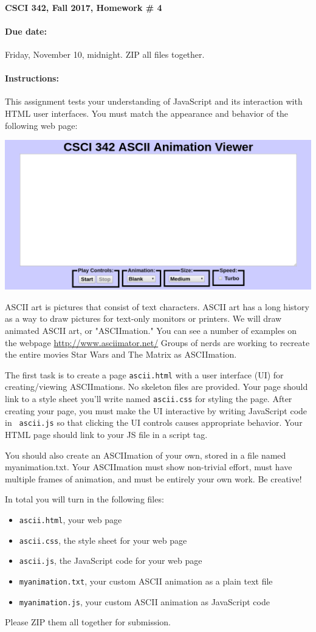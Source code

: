 \documentclass{article}
\newcommand{\myitem}{\paragraph}
\begin{document}
\myitem{CSCI 342, Fall 2017, Homework \# 4}

\myitem{Due date:}  Friday, November 10, midnight.  ZIP all files
together.

\myitem{Instructions:}


This assignment tests your understanding of JavaScript and its
interaction with HTML user interfaces.  You must match the appearance
and behavior of the following web page:

\centerline{\includegraphics[scale=0.5]{images/screenshot.png}}

ASCII art is pictures that consist of text characters.  ASCII art has
a long history as a way to draw pictures for text-only monitors or
printers.  We will draw animated ASCII art, or "ASCIImation." You can
see a number of examples on the webpage
\url{http://www.asciimator.net/} Groups of nerds are working to
recreate the entire movies Star Wars and The Matrix as ASCIImation.

The first task is to create a page {\tt ascii.html} with a user
interface (UI) for creating/viewing ASCIImations.  No skeleton files
are provided.  Your page should link to a style sheet you'll write
named {\tt ascii.css} for styling the page.  After creating your page,
you must make the UI interactive by writing JavaScript code in {\tt
  ascii.js} so that clicking the UI controls causes appropriate
behavior.  Your HTML page should link to your JS file in a script tag.

You should also create an ASCIImation of your own, stored in a file
named myanimation.txt.  Your ASCIImation must show non-trivial effort,
must have multiple frames of animation, and must be entirely your own
work.  Be creative!

In total you will turn in the following
files:
\begin{itemize}
\item {\tt ascii.html}, your web page
\item {\tt ascii.css}, the style sheet for your
  web page
\item {\tt ascii.js}, the JavaScript code for your web page
\item {\tt myanimation.txt}, your custom ASCII animation as a plain text file
\item {\tt myanimation.js}, your custom ASCII animation as JavaScript code
\end{itemize}
Please ZIP them all together for submission.
\end{document}
